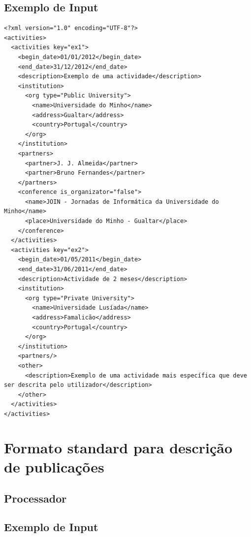 \documentclass[a4paper,11pt,openright,openbib]{article}
\begin{document}
\subsection{Exemplo de Input}
\begin{verbatim}
<?xml version="1.0" encoding="UTF-8"?>
<activities>
  <activities key="ex1">
    <begin_date>01/01/2012</begin_date>
    <end_date>31/12/2012</end_date>
    <description>Exemplo de uma actividade</description>
    <institution>
      <org type="Public University">
        <name>Universidade do Minho</name>
        <address>Gualtar</address>
        <country>Portugal</country>
      </org>
    </institution>
    <partners>
      <partner>J. J. Almeida</partner>
      <partner>Bruno Fernandes</partner>
    </partners>
    <conference is_organizator="false">
      <name>JOIN - Jornadas de Informática da Universidade do Minho</name>
      <place>Universidade do Minho - Gualtar</place>
    </conference>
  </activities>
  <activities key="ex2">
    <begin_date>01/05/2011</begin_date>
    <end_date>31/06/2011</end_date>
    <description>Actividade de 2 meses</description>
    <institution>
      <org type="Private University">
        <name>Universidade Lusíada</name>
        <address>Famalicão</address>
        <country>Portugal</country>
      </org>
    </institution>
    <partners/>
    <other>
      <description>Exemplo de uma actividade mais específica que deve ser descrita pelo utilizador</description>
    </other>
  </activities>
</activities>
\end{verbatim}

\section{Formato standard para descrição de publicações}
\subsection{Processador}
\subsection{Exemplo de Input}
\end{document}
